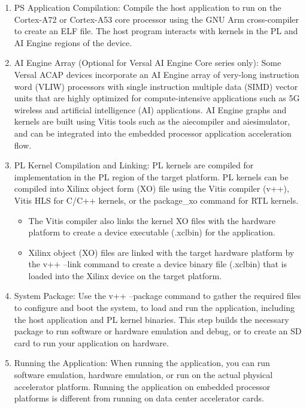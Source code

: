 \begin{enumerate}
    \item PS Application Compilation: Compile the host application to run on the Cortex-A72 or Cortex-A53 core processor using the GNU Arm cross-compiler to create an ELF file. The host program interacts with kernels in the PL and AI Engine regions of the device. 
    \item  AI Engine Array (Optional for Versal AI Engine Core series only): Some Versal ACAP devices incorporate an AI Engine array of very-long instruction word (VLIW) processors with single instruction multiple data (SIMD) vector units that are highly optimized for compute-intensive applications such as 5G wireless and artificial intelligence (AI) applications. AI Engine graphs and kernels are built using Vitis tools such as the aiecompiler and aiesimulator, and can be integrated into the embedded processor application acceleration flow.
    \item  PL Kernel Compilation and Linking: PL kernels are compiled for implementation in the PL region of the target platform. PL kernels can be compiled into Xilinx object form (XO) file using the Vitis compiler (v++), Vitis HLS for C/C++ kernels, or the package\_xo command for RTL
    kernels. 
    \begin{itemize}
        \item The Vitis compiler also links the kernel XO files with the hardware platform to create a device executable (.xclbin) for the application.
        \item Xilinx object (XO) files are linked with the target hardware platform by the v++ --link command to create a device binary file (.xclbin) that is loaded into the Xilinx device on the target platform.
    \end{itemize}
    \item System Package: Use the v++ --package command to gather the required files to configure and boot the system, to load and run the application, including the host application and PL kernel binaries. This step builds the necessary package to run software or hardware emulation and debug, or to create an SD card to run your application on hardware.
    \item Running the Application: When running the application, you can run software emulation, hardware emulation, or run on the actual physical accelerator platform. Running the application on embedded processor platforms is different from running on data center accelerator cards. 
    \begin{itemize}

\end{itemize}
\end{enumerate}
